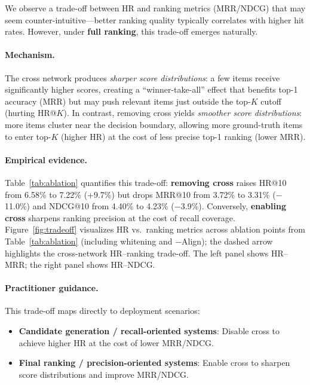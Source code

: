 \documentclass[sigconf,natbib=true,anonymous]{acmart}
\begin{document}
We observe a trade-off between HR and ranking metrics (MRR/NDCG) that
may seem counter-intuitive---better ranking quality typically correlates
with higher hit rates. However, under \textbf{full ranking}, this
trade-off emerges naturally.

\paragraph{Mechanism.}
The cross network produces \emph{sharper score distributions}:
a few items receive significantly higher scores, creating a
``winner-take-all'' effect that benefits top-1 accuracy (MRR)
but may push relevant items just outside the top-$K$ cutoff (hurting HR@$K$).
In contrast, removing cross yields \emph{smoother score distributions}:
more items cluster near the decision boundary,
allowing more ground-truth items to enter top-$K$ (higher HR)
at the cost of less precise top-1 ranking (lower MRR).

\paragraph{Empirical evidence.}
Table~\ref{tab:ablation} quantifies this trade-off:
\textbf{removing cross} raises HR@10 from 6.58\% to 7.22\% (+9.7\%)
but drops MRR@10 from 3.72\% to 3.31\% ($-$11.0\%) and NDCG@10
from 4.40\% to 4.23\% ($-$3.9\%).
Conversely, \textbf{enabling cross} sharpens ranking precision
at the cost of recall coverage.
Figure~\ref{fig:tradeoff} visualizes HR vs.\ ranking metrics across
ablation points from Table~\ref{tab:ablation} (including whitening
and $-$Align); the dashed arrow highlights the cross-network
HR--ranking trade-off. The left panel shows HR--MRR; the right
panel shows HR--NDCG.

\paragraph{Practitioner guidance.}
This trade-off maps directly to deployment scenarios:
\begin{itemize}[leftmargin=*,itemsep=2pt]
  \item \textbf{Candidate generation / recall-oriented systems}:
    Disable cross to achieve higher HR at the cost of lower MRR/NDCG.
  \item \textbf{Final ranking / precision-oriented systems}:
    Enable cross to sharpen score distributions and improve MRR/NDCG.
\end{itemize}
\end{document}

